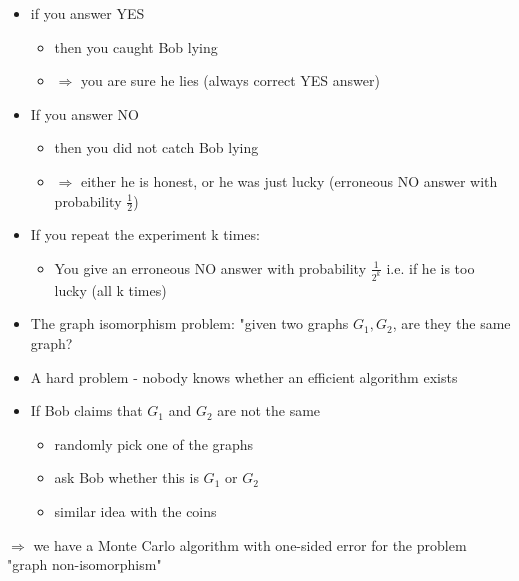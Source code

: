 \documentclass{article}[18pt]
\begin{document}
\begin{itemize}
	\item if you answer YES
	\begin{itemize}
		\item then you caught Bob lying
		\item $\Rightarrow$ you are sure he lies (always correct YES answer)
	\end{itemize}
	\item If you answer NO
	\begin{itemize}
		\item then you did not catch Bob lying
		\item $\Rightarrow$ either he is honest, or he was just lucky (erroneous NO answer with probability $\frac{1}{2}$)
	\end{itemize}
	\item If you repeat the experiment k times:
	\begin{itemize}
		\item You give an erroneous NO answer with probability $\frac{1}{2^k}$ i.e. if he is too lucky (all k times)
	\end{itemize}
\end{itemize}
\begin{itemize}
	\item The graph isomorphism problem: "given two graphs $G_1,G_2$, are they the same graph?
	\item A hard problem - nobody knows whether an efficient algorithm exists
	\item If Bob claims that $G_1$ and $G_2$ are not the same
	\begin{itemize}
		\item randomly pick one of the graphs
		\item ask Bob whether this is $G_1$ or $G_2$
		\item similar idea with the coins
	\end{itemize}
\end{itemize}
$\Rightarrow$ we have a Monte Carlo algorithm with one-sided error for the problem "graph non-isomorphism"
\end{document}
